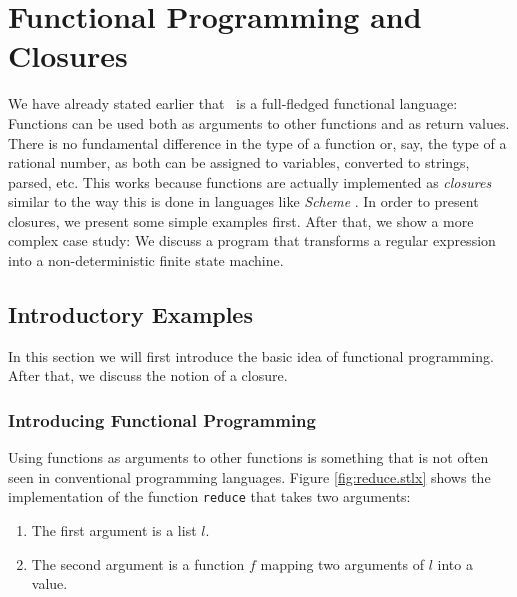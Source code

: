 \chapter{Functional Programming and Closures \label{chapter:closures}}
We have already stated earlier that \setlx\ is a full-fledged functional language:
Functions can be used both as arguments to other functions and as return values.  There is
no fundamental difference in the type of a function or, say, the type of a rational
number, as both can be assigned to variables, converted to strings, parsed, etc.
This works because functions are actually implemented as \emph{closures} similar to the
way this is done in languages like \textsl{Scheme} \cite{sussman:75}. 
In order to present closures, we present some simple examples first.  After that, we show
a more complex case study: We discuss a program that transforms a regular expression into a
non-deterministic finite state machine.

\section{Introductory Examples}
In this section we will first introduce the basic idea of functional programming.
After that, we discuss the notion of a closure.

\subsection{Introducing Functional Programming}
Using functions as arguments to other functions is something that is not often seen in
conventional programming languages.  Figure \ref{fig:reduce.stlx} shows the implementation of
the function \texttt{reduce} that takes two arguments:
\begin{enumerate}
\item The first argument is a list $l$.
\item The second argument is a function $f$ mapping two arguments of $l$ into a value.
\end{enumerate}

